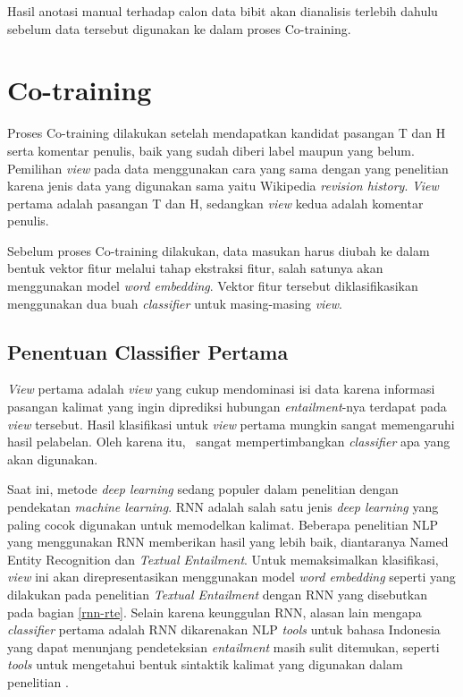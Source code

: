 Hasil anotasi manual terhadap calon data bibit akan dianalisis terlebih dahulu sebelum data tersebut digunakan ke dalam proses Co-training.


\section{Co-training} \label{sec:Co-training}
Proses Co-training dilakukan setelah mendapatkan kandidat pasangan T dan H serta komentar penulis, baik yang sudah diberi label maupun yang belum. Pemilihan \textit{view} pada data menggunakan cara yang sama dengan yang penelitian \cite{zanzottoRTEexpand} karena jenis data yang digunakan sama yaitu Wikipedia \textit{revision history}. \textit{View} pertama adalah pasangan T dan H, sedangkan \textit{view} kedua adalah komentar penulis.

Sebelum proses Co-training dilakukan, data masukan harus diubah ke dalam bentuk vektor fitur melalui tahap ekstraksi fitur, salah satunya akan menggunakan model \textit{word embedding}. Vektor fitur tersebut diklasifikasikan menggunakan dua buah \textit{classifier} untuk masing-masing \textit{view}. 

	\subsection{Penentuan Classifier Pertama}
	\textit{View} pertama adalah \textit{view} yang cukup mendominasi isi data karena informasi pasangan kalimat yang ingin diprediksi hubungan \textit{entailment}-nya terdapat pada \textit{view} tersebut. Hasil klasifikasi untuk \textit{view} pertama mungkin sangat memengaruhi hasil pelabelan. Oleh karena itu, \saya~sangat mempertimbangkan \textit{classifier} apa yang akan digunakan.
	
	Saat ini, metode \textit{deep learning} sedang populer dalam penelitian dengan pendekatan \textit{machine learning}. RNN adalah salah satu jenis \textit{deep learning} yang paling cocok digunakan untuk memodelkan kalimat. Beberapa penelitian NLP yang menggunakan RNN memberikan hasil yang lebih baik, diantaranya Named Entity Recognition \citep{Hammerton:2003:CONLL} dan \textit{Textual Entailment}. Untuk memaksimalkan klasifikasi, \textit{view} ini akan direpresentasikan menggunakan model \textit{word embedding} seperti yang dilakukan pada penelitian \textit{Textual Entailment} dengan RNN yang disebutkan pada bagian \ref{rnn-rte}. Selain karena keunggulan RNN, alasan lain mengapa \textit{classifier} pertama adalah RNN dikarenakan NLP \textit{tools} untuk bahasa Indonesia yang dapat menunjang pendeteksian \textit{entailment} masih sulit ditemukan, seperti \textit{tools} untuk mengetahui bentuk sintaktik kalimat yang digunakan dalam penelitian \cite{zanzottoRTEexpand}.
	
